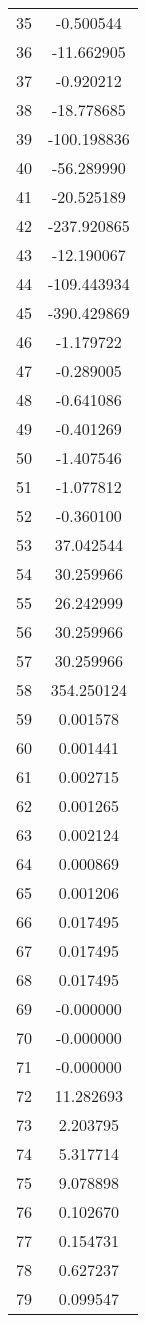 \documentclass[12pt]{article}
\begin{document}
\begin{longtable}{@{}cc@{}}
35 & -0.500544 \\
36 & -11.662905 \\
37 & -0.920212 \\
38 & -18.778685 \\
39 & -100.198836 \\
40 & -56.289990 \\
41 & -20.525189 \\
42 & -237.920865 \\
43 & -12.190067 \\
44 & -109.443934 \\
45 & -390.429869 \\
46 & -1.179722 \\
47 & -0.289005 \\
48 & -0.641086 \\
49 & -0.401269 \\
50 & -1.407546 \\
51 & -1.077812 \\
52 & -0.360100 \\
53 & 37.042544 \\
54 & 30.259966 \\
55 & 26.242999 \\
56 & 30.259966 \\
57 & 30.259966 \\
58 & 354.250124 \\
59 & 0.001578 \\
60 & 0.001441 \\
61 & 0.002715 \\
62 & 0.001265 \\
63 & 0.002124 \\
64 & 0.000869 \\
65 & 0.001206 \\
66 & 0.017495 \\
67 & 0.017495 \\
68 & 0.017495 \\
69 & -0.000000 \\
70 & -0.000000 \\
71 & -0.000000 \\
72 & 11.282693 \\
73 & 2.203795 \\
74 & 5.317714 \\
75 & 9.078898 \\
76 & 0.102670 \\
77 & 0.154731 \\
78 & 0.627237 \\
79 & 0.099547 \\

\end{longtable}
\end{document}

